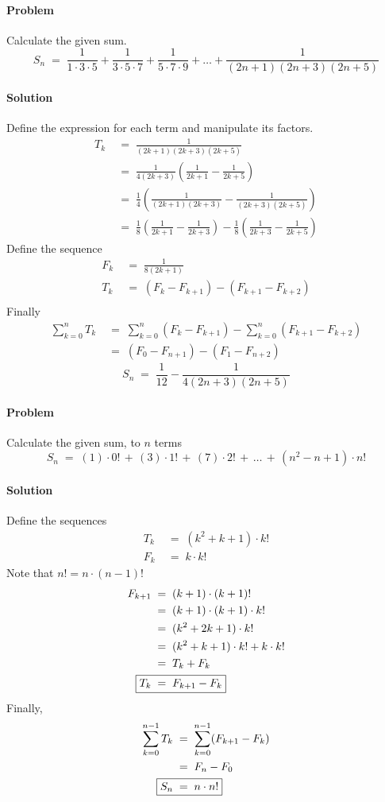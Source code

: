 \documentclass[a4paper, 11pt, reqno]{article}
\newcounter{prob}
\def\problem{\stepcounter{prob}\paragraph{Problem \arabic{prob}}}
\def\solution{\paragraph{Solution}}
\begin{document}
	\problem
	Calculate the given sum.
	\begin{equation*}
		S_n \; = \;  \frac{1}{1\cdot 3\cdot 5} + \frac{1}{3\cdot 5\cdot 7} + \frac{1}{5\cdot 7\cdot 9} + \dots + \frac{1}{(2n + 1)(2n + 3)(2n + 5)}
	\end{equation*}
	\solution
	Define the expression for each term and manipulate its factors.
	\begin{align*}
		T_k	\; &= \; \frac{1}{(2k + 1)(2k + 3)(2k + 5)}	\\
			\; &= \; \frac{1}{4(2k + 3)}\left( \frac{1}{2k + 1} - \frac{1}{2k + 5} \right) \\
			\; &= \; \frac{1}{4} \left( \frac{1}{(2k + 1)(2k + 3)} - \frac{1}{(2k + 3)(2k + 5)}\right)	\\
			\; &= \; \frac{1}{8} \left( \frac{1}{2k + 1} - \frac{1}{2k + 3} \right) 
				-\frac{1}{8} \left( \frac{1}{2k + 3} - \frac{1}{2k + 5} \right)
	\end{align*}
	Define the sequence
	\begin{align*}
		F_k	\; &= \; \frac{1}{8 (2k + 1)}	\\
		T_k	\; &= \; (F_k - F_{k + 1}) - (F_{k + 1} - F_{k + 2})	\\
	\end{align*}
	Finally
	\begin{align*}
		\sum_{k=0}^{n} T_k 
			\; &= \; \sum_{k=0}^{n} (F_k - F_{k + 1}) - \sum_{k=0}^{n} (F_{k + 1} - F_{k + 2}) \\
			\; &= \; (F_0 - F_{n + 1}) - (F_1 - F_{n + 2})
	\end{align*}
	\begin{equation*}
		\boxed{ S_n \; = \;  \frac{1}{12} - \frac{1}{4(2n + 3)(2n + 5)} }
	\end{equation*}
	
	\clearpage
	\problem
	Calculate the given sum, to $n$ terms
	\begin{equation*}
		S_n  \;=\;  (1)\cdot 0! \,+\, (3)\cdot 1! \,+\, (7)\cdot 2! \,+\, \dots \,+\, (n^2 - n + 1)\cdot n!
	\end{equation*}
	\solution
	Define the sequences
	\begin{align*}
		T_k  \; &= \;  (k^2 + k + 1)\cdot k! \\
		F_k  \; &= \;  k\cdot k!
	\end{align*}
	Note that $n! = n\cdot (n-1)!$
	\begin{align*}
		F_{k+1}  \; &= \; (k + 1)\cdot (k + 1)! \\
			 \; &= \; (k + 1)\cdot (k + 1)\cdot k! \\
			 \; &= \; (k^2 + 2k + 1)\cdot k! \\
			 \; &= \; (k^2 + k + 1)\cdot k! + k\cdot k! \\
			 \; &= \; T_k + F_k \\
		\Aboxed{T_k \; &= \;  F_{k+1} - F_{k}}
	\end{align*}
	Finally,
	\begin{align*}
		\sum_{k=0}^{n-1} T_k
		 	\; &= \; \sum_{k=0}^{n-1} (F_{k+1} - F_{k}) \\
			\; &= \; F_n - F_0 \\
		\Aboxed{S_n	\; &= \;  n\cdot n!}
	\end{align*}
	
\end{document}
